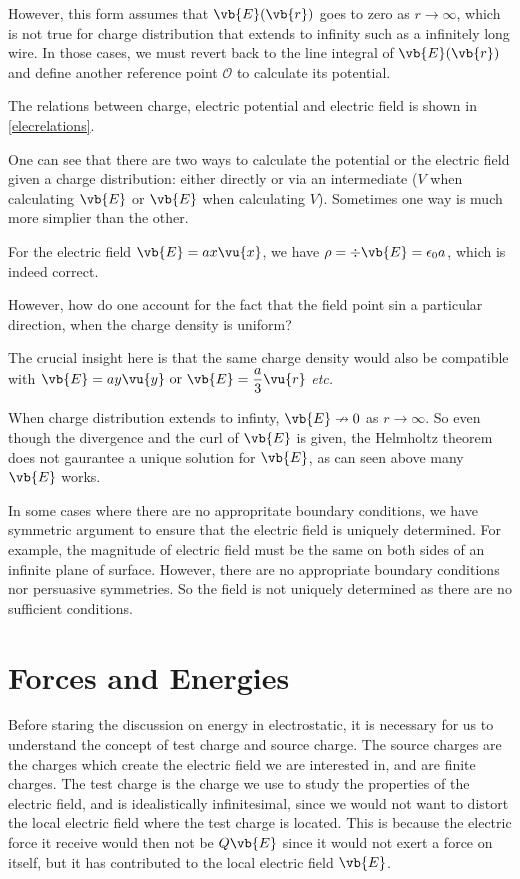 \documentclass[english,a4paper,12pt]{report}
\begin{document}
However, this form assumes that \(\vb{E} (\vb{r} )\) goes to zero as \(r \to \infty\), which is not true for charge distribution that extends to infinity such as a infinitely long wire. In those cases, we must revert back to the line integral of \(\vb{E} (\vb{r} )\) and define another reference point \(\mathcal{O}\) to calculate its potential.     

The relations between charge, electric potential and electric field is shown in \cref{elecrelations}. 


One can see that there are two ways to calculate the potential or the electric field given a charge distribution: either directly or via an intermediate (\(V\) when calculating \(\vb{E} \) or \(\vb{E} \) when calculating \(V\)). Sometimes one way is much more simplier than the other. 

{For the electric field \(\vb{E}  = ax \vu{x} \), we have \(\rho = \div{\vb{E} } = \epsilon _0 a\), which is indeed correct.  

However, how do one account for the fact that the field point sin a particular direction, when the charge density is uniform?}
{The crucial insight here is that the same charge density would also be compatible with \(\displaystyle \vb{E}  = ay \vu{y} \text { or }  \vb{E}  = \frac{a}{3}\vu{r}\)\textit{ etc.}

When charge distribution extends to infinty, \(\vb{E} \nrightarrow 0\) as \(r \to \infty\). So even though the divergence and the curl of \(\vb{E} \) is given, the Helmholtz theorem does not gaurantee a unique solution for \(\vb{E}\), as can seen above many \(\vb{E} \) works.

In some cases where there are no appropritate boundary conditions, we have symmetric argument to ensure that the electric field is uniquely determined. For example, the magnitude of electric field must be the same on both sides of an infinite plane of surface. However, there are no appropriate boundary conditions nor persuasive symmetries. So the field is not uniquely determined as there are no sufficient conditions.} 

\section{Forces and Energies}

Before staring the discussion on energy in electrostatic, it is necessary for us to understand the concept of test charge and source charge. The source charges are the charges which create the electric field we are interested in, and are finite charges. The test charge is the charge we use to study the properties of the electric field, and is idealistically infinitesimal, since we would not want to distort the local electric field where the test charge is located. This is because the electric force it receive would then not be \(Q\vb{E} \) since it would not exert a force on itself, but it has contributed to the local electric field \(\vb{E} \).  
\end{document}
